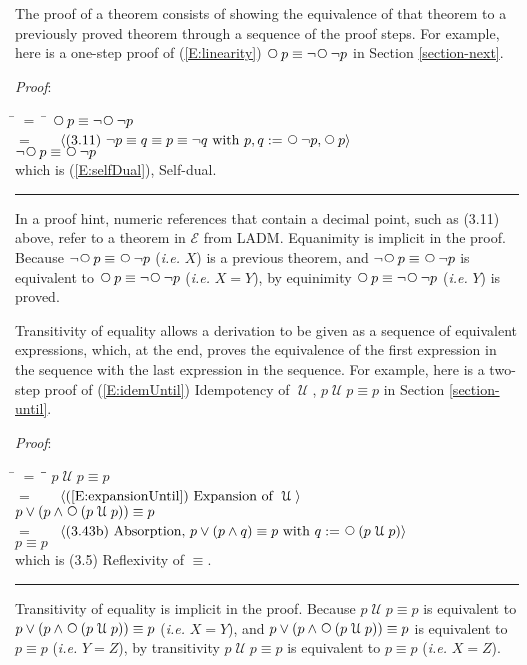 \documentclass[12pt, fleqn, leqno]{article}
\newcommand{\lgap}{2pt}                             %
\newcommand{\mymathindent}{24pt}                    %
\newcommand{\Until}{\;\mathcal{U}\;}
\newcommand{\Next}{\;\,\text{\raisebox{3.5pt}{\circle{6}}}}
\newcommand{\myqed}{\rule[-.23ex]{1.2ex}{2.0ex}}
\newcommand{\myqedtab}{\hspace{384pt}}              %
\newcommand{\Gll} {\langle}                         %
\newcommand{\Ggg} {\rangle}                         %
\newcommand{\Hint}[1]     {\ \ \ $\Gll              \mbox{#1} \Ggg$ }   %
\begin{document}
The proof of a theorem consists of showing the equivalence of that theorem to a previously proved theorem
through a sequence of the proof steps.
For example, here is a one-step proof of (\ref{E:linearity}) $\Next p \equiv \neg\Next\neg p$ in Section \ref{section-next}.

\emph{Proof}:
\begin{tabbing}
\hspace{\mymathindent} \= $= \;$ \= \kill
  \> \>   $\Next p \equiv \neg\Next\neg p$\\[\lgap]
  \> $=$  \>  \Hint{(3.11) $\neg p \equiv q \equiv p \equiv \neg q$ with $p,q := \Next\neg p, \Next p$} \\[\lgap]
  \> \>   $\neg\Next p \equiv \Next\neg p$ \\[\lgap]
  \> which is (\ref{E:selfDual}), Self-dual. \quad \myqed
\end{tabbing}
In a proof hint, numeric references that contain a decimal point, such as (3.11) above, refer to a theorem in $\mathcal{E}$ from LADM.
Equanimity is implicit in the proof.
Because $\neg\Next p \equiv \Next\neg p$ (\textit{i.e.} $X$) is a previous theorem, and $\neg\Next p \equiv \Next\neg p$ is equivalent to $\Next p \equiv \neg\Next\neg p$ (\textit{i.e.} $X=Y$), by equinimity $\Next p \equiv \neg\Next\neg p$ (\textit{i.e.} $Y$) is proved.

Transitivity of equality allows a derivation to be given as a sequence of equivalent expressions, which, at the end,
proves the equivalence of the first expression in the sequence with the last expression in the sequence.
For example, here is a two-step proof of (\ref{E:idemUntil}) Idempotency of $\Until$, $p \Until p \equiv p$ in Section \ref{section-until}.

\emph{Proof}:
\begin{tabbing}
\hspace{\mymathindent} \= $= \;$ \= \myqedtab \= \kill
  \> \>   $p \Until p\equiv p$\\[\lgap]
  \> $=$  \>  \Hint{(\ref{E:expansionUntil}) Expansion of $\Until$}\\[\lgap]
  \> \>   $p \lor (p \land \Next(p \Until p))\equiv p$\\[\lgap]
  \> $=$  \>  \Hint{(3.43b) Absorption, $p \lor (p \land q) \equiv p$ with $q := \Next (p \Until p)$}\\[\lgap]
  \> \>   $p\equiv p$\\[\lgap]
  \> which is (3.5) Reflexivity of $\equiv$. \quad \myqed
\end{tabbing}
Transitivity of equality is implicit in the proof.
Because $p \Until p\equiv p$ is equivalent to $p \lor (p \land \Next(p \Until p))\equiv p$ (\textit{i.e.} $X=Y$),
and $p \lor (p \land \Next(p \Until p))\equiv p$ is equivalent to $p\equiv p$ (\textit{i.e.} $Y=Z$),
by transitivity $p \Until p\equiv p$ is equivalent to $p\equiv p$ (\textit{i.e.} $X=Z$).
\end{document}
